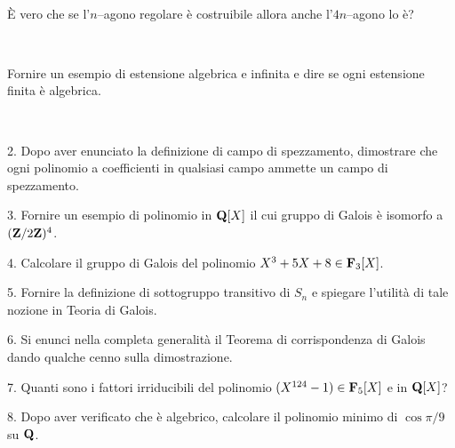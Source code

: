 \ \dotfill\ \bigskip\bigskip\bigskip\vfil

 \`E vero che se l'$n$--agono regolare \`e costruibile allora anche
l'$4n$--agono lo \`e?\medskip\bigskip\bigskip

\ \dotfill\ \bigskip\bigskip\bigskip

 Fornire un esempio di estensione algebrica e infinita e dire se ogni estensione finita \`e algebrica.\medskip\bigskip\bigskip

\ \dotfill\ \bigskip\bigskip\bigskip


\vfil\eject


\item{2.} Dopo aver enunciato la definizione di campo di spezzamento, dimostrare 
che ogni polinomio a coefficienti in qualsiasi campo ammette un campo di spezzamento.

\vv


\item{3.} Fornire un esempio di polinomio in ${\bf Q}[X]$ il cui gruppo di Galois
\`e isomorfo a $({\bf Z}/2{\bf Z})^4$.
\ve\ \vs


\item{4.} Calcolare il gruppo di Galois del polinomio $X^3+5X+8\in{\bf F}_3[X]$.\vv

\item{5.} Fornire la definizione di sottogruppo transitivo di $S_n$ e spiegare l'utilit\`a di
tale nozione in Teoria di Galois.
\ve\ \vs


\item{6.} Si enunci nella completa generalit\`a il Teorema di
corrispondenza di Galois dando qualche cenno sulla dimostrazione.\vskip 6cm\bigskip\bigskip\bigskip\vv\vv


\item{7.} Quanti sono i fattori irriducibili del polinomio $(X^{124}-1)\in{\bf F}_5[X]$ e in ${\bf Q}[X]$?
\vskip 6cm\bigskip\bigskip\bigskip\vv\vv

\item{8.}  Dopo aver verificato che \`e algebrico, calcolare
il polinomio minimo di $\cos \pi/9$ su ${\bf Q}$.


\vv

\ \vst
\bye
